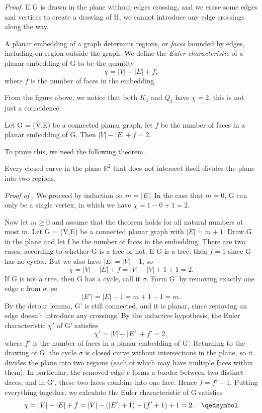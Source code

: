 \documentclass{tufte-handout}
\begin{document}
\textit{Proof.} If G is drawn in the plane without edges crossing, and we erase some
edges and vertices to create a drawing of H, we cannot introduce any edge crossings along the way. \qedsymbol

A planar embedding of a graph determins regions, or \textit{faces} bounded by edges, 
including on region outside the graph.
We define the \textit{Euler characteristic} of a planar embedding of G to be the quantity
\[\chi = \left|V\right| - \left|E\right| + f,\]
where \( f \) is the number of faces in the embedding.

From the figure above, we notice that both \( K_4 \) and \( Q_3 \) have \(\chi = 2\), this is not just a coincidence.

\begin{Theorem}
    \label{thm:euler_formula}
    Let G = (V,E) be a connected planar graph, let \(f\) be the number of faces in a planar embedding of G.
    Then \( \left|V\right| - \left|E\right| + f = 2 \).
\end{Theorem}

To prove this, we need the following theorem.

\begin{Theorem}
    Every closed curve in the plane \(\mathbb{R}^2 \) that does not intersect itself divides the plane into two regions.
\end{Theorem}

\textit{Proof of .} We proceed by induction on \( m = \left|E\right| \).
In the case that \( m=0 \), G can only be a single vertex, in which we have \( \chi = 1-0+1 = 2 \).

Now let \( m \geq 0 \) and assume that the theorem holds for all natural numbers at most m.
Let G = (V,E) be a connected planar graph with \(\left|E\right| = m+1\).
Draw G in the plane and let f be the number of faces in the embedding.
There are two cases, according to whether G is a tree or not.
If G is a tree, then \( f =1\) since G has no cycles. But we also have \(\left|E\right| = \left|V\right| - 1\), so
\[\chi = \left|V\right| - \left|E\right| + f = \left|V\right| - \left|V\right| + 1 + 1 = 2.\]
If G is not a tree, then G has a cycle, call it \(\sigma\). Form G' by removing exactly one edge \( e \) from \(\sigma\), so
\[\left|E'\right| = \left|E\right| - 1 = m + 1 - 1 = m.\]
By the detour lemma, G' is still connected, and it is planar, since removing an edge doesn't introduce any crossings.
By the inductive hypothesis, the Euler characteristic \( \chi' \) of G' satisfies
\[\chi' = \left|V\right| - \left|E'\right| + f' = 2,\]
where \( f' \) is the number of faces in a planar embedding of G'.
Returning to the drawing of G, the cycle \(\sigma\) is closed curve without intersections in the plane, so it divides
the plane into two regions (each of which may have multiple faces within them).
In particular, the removed edge \( e \) forms a border between two distinct daces, and in G',
these two faces combine into one face. Hence \( f = f' + 1 \).
Putting everything together, we calculate the Euler characteristic of G satisfies
\[\chi = \left|V\right| - \left|E\right| + f = \left|V\right| - (\left|E'\right|+1) + (f'+1) + 1 = 2.\quad \qedsymbol\]
\end{document}
